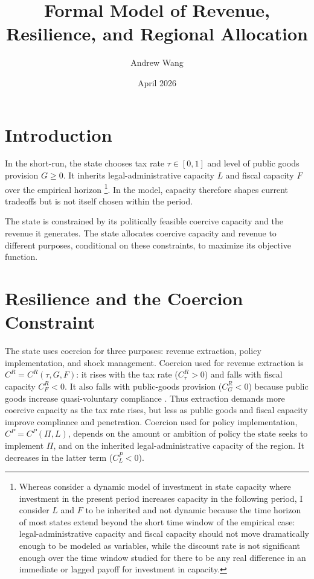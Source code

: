 \documentclass[12pt]{article}
\title{Formal Model of Revenue, Resilience, and Regional Allocation}
\author{Andrew Wang}
\date{April 2026}
\begin{document}
\maketitle

\section*{Introduction}

In the short-run, the state chooses tax rate $\tau \in [0,1]$ and level of public goods provision $G \ge 0$. It inherits legal-administrative capacity $L$ and fiscal capacity $F$ over the empirical horizon \footnote{Whereas \cite{besleyOriginsStateCapacity2009} consider a dynamic model of investment in state capacity where investment in the present period increases capacity in the following period, I consider $L$ and $F$ to be inherited and not dynamic because the time horizon of most states extend beyond the short time window of the empirical case: legal-administrative capacity and fiscal capacity should not move dramatically enough to be modeled as variables, while the discount rate is not significant enough over the time window studied for there to be any real difference in an immediate or lagged payoff for investment in capacity.}. In the model, capacity therefore shapes current tradeoffs but is not itself chosen within the period.

The state is constrained by its politically feasible coercive capacity and the revenue it generates. The state allocates coercive capacity and revenue to different purposes, conditional on these constraints, to maximize its objective function.

\section* {Resilience and the Coercion Constraint}

The state uses coercion for three purposes: revenue extraction, policy implementation, and shock management. Coercion used for revenue extraction is $C^R = C^R(\tau,G,F)$: it rises with the tax rate ($C^R_{\tau} > 0$) and falls with fiscal capacity $C^R_F < 0$. It also falls with public-goods provision ($C^R_G < 0$) because public goods increase quasi-voluntary compliance \cite{levi1988}. Thus extraction demands more coercive capacity as the tax rate rises, but less as public goods and fiscal capacity improve compliance and penetration. Coercion used for policy implementation, $C^P = C^P(\Pi,L)$, depends on the amount or ambition of policy the state seeks to implement $\Pi$, and on the inherited legal-administrative capacity of the region. It decreases in the latter term ($C^P_L < 0$).
\end{document}
